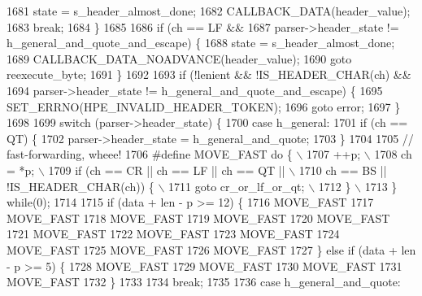 \begin{DoxyCode}
1681           state = s_header_almost_done;
1682           CALLBACK_DATA(header\_value);
1683           \textcolor{keywordflow}{break};
1684         \}
1685 
1686         \textcolor{keywordflow}{if} (ch == LF &&
1687             parser->header_state != h_general_and_quote_and_escape) \{
1688           state = s_header_almost_done;
1689           CALLBACK_DATA_NOADVANCE(header\_value);
1690           \textcolor{keywordflow}{goto} reexecute\_byte;
1691         \}
1692 
1693         \textcolor{keywordflow}{if} (!lenient && !IS_HEADER_CHAR(ch) &&
1694             parser->header_state != h_general_and_quote_and_escape) \{
1695           SET_ERRNO(HPE_INVALID_HEADER_TOKEN);
1696           \textcolor{keywordflow}{goto} error;
1697         \}
1698 
1699         \textcolor{keywordflow}{switch} (parser->header_state) \{
1700           \textcolor{keywordflow}{case} h_general:
1701             \textcolor{keywordflow}{if} (ch == QT) \{
1702               parser->header_state = h_general_and_quote;
1703             \}
1704 
1705             \textcolor{comment}{// fast-forwarding, wheee!}
1706 \textcolor{preprocessor}{            #define MOVE\_FAST do \{                    \(\backslash\)}
1707 \textcolor{preprocessor}{              ++p;                                    \(\backslash\)}
1708 \textcolor{preprocessor}{              ch = *p;                                \(\backslash\)}
1709 \textcolor{preprocessor}{              if (ch == CR || ch == LF || ch == QT || \(\backslash\)}
1710 \textcolor{preprocessor}{                  ch == BS || !IS\_HEADER\_CHAR(ch)) \{  \(\backslash\)}
1711 \textcolor{preprocessor}{                goto cr\_or\_lf\_or\_qt;                  \(\backslash\)}
1712 \textcolor{preprocessor}{              \}                                       \(\backslash\)}
1713 \textcolor{preprocessor}{            \} while(0);}
1714 
1715             \textcolor{keywordflow}{if} (data + len - p >= 12) \{
1716               MOVE_FAST
1717               MOVE_FAST
1718               MOVE_FAST
1719               MOVE_FAST
1720               MOVE_FAST
1721               MOVE_FAST
1722               MOVE_FAST
1723               MOVE_FAST
1724               MOVE_FAST
1725               MOVE_FAST
1726               MOVE_FAST
1727             \} \textcolor{keywordflow}{else} \textcolor{keywordflow}{if} (data + len - p >= 5) \{
1728               MOVE_FAST
1729               MOVE_FAST
1730               MOVE_FAST
1731               MOVE_FAST
1732             \}
1733 
1734             \textcolor{keywordflow}{break};
1735 
1736           \textcolor{keywordflow}{case} h_general_and_quote:

\end{DoxyCode}
